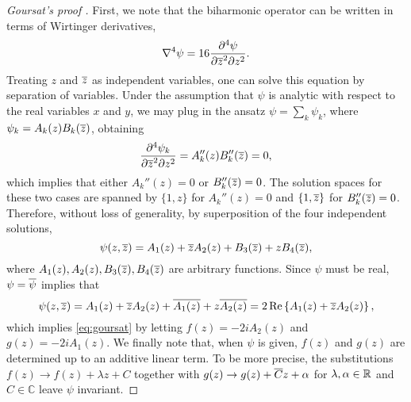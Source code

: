 \begin{proof}[Goursat's proof \cite{goursat98}]
First, we note that the biharmonic operator can be written in terms of Wirtinger derivatives,
\begin{equation}
\nabla^4 \psi = 16\frac{\partial^4 \psi}{\partial{\overline{z}}^2 \partial z^2}.
\end{equation}
Treating $z$ and ${\overline{z}}$ as independent variables, one can solve this equation by separation of variables. Under the assumption that $\psi$ is analytic with respect to the real variables $x$ and $y$, we may plug in the ansatz $\psi=\sum_k \psi_k$, where $\psi_k= A_k(z)B_k({\overline{z}})$, obtaining
\begin{equation}
\frac{\partial^4 \psi_k}{\partial{\overline{z}}^2 \partial z^2} = A_k''(z) B_k''({\overline{z}}) = 0,
\end{equation} 
which implies that either $A_k''(z)=0$ or $B_k''({\overline{z}})=0$. The solution spaces for these two cases are spanned by $\{1,z\}$ for $A_k''(z)=0$  and $\{1,{\overline{z}}\}$ for $B_k''({\overline{z}})=0$. Therefore, without loss of generality, by superposition of the four independent solutions,
\begin{equation}
\psi(z,{\overline{z}}) =  A_1(z) + {\overline{z}} A_2(z) + B_3({\overline{z}}) + z B_4({\overline{z}}),
\end{equation}
where $A_1(z), A_2(z), B_3({\overline{z}}), B_4({\overline{z}})$ are arbitrary functions. Since $\psi$ must be real, $\psi={\overline{\psi}}$ implies that 
\begin{equation}
\psi(z,{\overline{z}}) =  A_1(z)  + {\overline{z}} A_2(z)  + {\overline{A_1(z)}} + z {\overline{A_2(z)}} = 2 \Re\left\{A_1(z) + {\overline{z}} A_2(z)\right\},
\end{equation}
which implies \eqref{eq:goursat} by letting $f(z) = -2i A_2(z)$ and $g(z) = -2i A_1(z)$. We finally note that, when $\psi$ is given, $f(z)$ and $g(z)$ are determined up to an additive linear term. To be more precise, the substitutions $f(z)\to f(z)+\lambda z + C$ together with $g(z)\to g(z)+{\overline{C}}z+\alpha$ for $\lambda,\alpha\in\mathbb{R}$ and $C\in\mathbb{C}$ leave $\psi$ invariant.
\end{proof}


